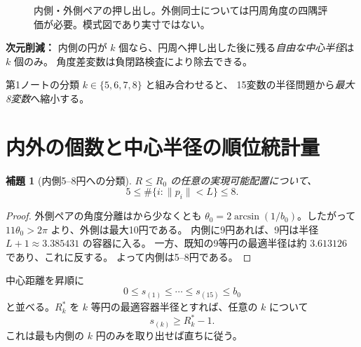 \documentclass[11pt,a4paper]{article}
\theoremstyle{JPthm}
\newtheorem{lemma}[theorem]{補題}
\theoremstyle{definition}
\newcommand{\Rc}{R_{0}}
\newcommand{\thzero}{\theta_{0}}
\newcommand{\bzero}{b_{0}}
\begin{document}
\begin{figure}[H]\centering
{}
\caption{内側・外側ペアの押し出し。外側同士については円周角度の四隅評価が必要。模式図であり実寸ではない。}
\end{figure}
\begin{statusbox}
\textbf{次元削減：} 内側の円が $k$ 個なら、円周へ押し出した後に残る\emph{自由な中心半径}は $k$ 個のみ。
角度差変数は負閉路検査により除去できる。\par
第1ノートの分類 $k\in\{5,6,7,8\}$ と組み合わせると、
15変数の半径問題から\emph{最大8変数}へ縮小する。
\end{statusbox}

\section{内外の個数と中心半径の順位統計量}
\begin{lemma}[内側5--8円への分類]\label{lem:class}
$R\le\Rc$ の任意の実現可能配置について、
\[
5\le\#\{i:\|p_i\|<L\}\le8.
\]
\end{lemma}
\begin{proof}
外側ペアの角度分離はから少なくとも
$\thzero=2\arcsin(1/\bzero)$。したがって
$11\thzero>2\pi$ より、外側は最大10円である。
内側に9円あれば、9円は半径 $L+1\approx3.385431$ の容器に入る。
一方、既知の9等円の最適半径は約 $3.613126$ であり、これに反する\cite{packomania}。
よって内側は5--8円である。
\end{proof}
中心距離を昇順に
\[
 0\le s_{(1)}\le\cdots\le s_{(15)}\le\bzero
\]
と並べる。$R_k^*$ を $k$ 等円の最適容器半径とすれば、任意の $k$ について
\begin{equation}\label{eq:orderlower}
 s_{(k)}\ge R_k^*-1.
\end{equation}
これは最も内側の $k$ 円のみを取り出せば直ちに従う。
\end{document}
